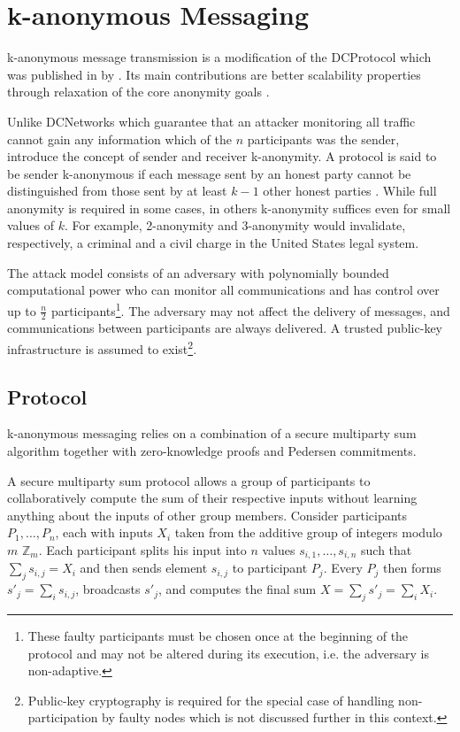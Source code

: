 \section{k-anonymous Messaging} \label{sec:k-anonymous_messaging}


k-anonymous message transmission is a modification of the \ac{DCProtocol} which was published in \citeyear{von2003k} by \citeauthor{von2003k}. Its main contributions are better scalability properties through relaxation
of the core anonymity goals \cite{von2003k}.

Unlike \acp{DCNetwork} which guarantee that an attacker monitoring all traffic cannot gain
any information which of the $n$ participants was the sender, \citeauthor{von2003k} introduce
the concept of sender and receiver k-anonymity. A protocol is said to be sender k-anonymous
if each message sent by an honest party cannot be distinguished from those sent by at least $k - 1$
other honest parties \cite{von2003k}. While full anonymity is required in some cases, in others
k-anonymity suffices even for small values of $k$. For example, 2-anonymity and 3-anonymity would invalidate, respectively, a criminal and a civil charge in the United States legal system.

The attack model consists of an adversary with polynomially bounded computational power
who can monitor all communications and
has control over up to $\frac{n}{2}$ participants\footnote{
These faulty participants must be chosen once at the beginning of the protocol and may not
be altered during its execution, i.e. the adversary is non-adaptive.}. The adversary may not affect
the delivery of messages, and communications between participants are always delivered.
A trusted public-key infrastructure is assumed to exist\footnote{Public-key cryptography is
required for the special case of handling non-participation by faulty nodes which is not discussed further
in this context.}.

\subsection{Protocol}

k-anonymous messaging relies on a combination of a secure multiparty sum algorithm
together with zero-knowledge proofs and Pedersen commitments.

A secure multiparty sum protocol allows a group of participants to collaboratively
compute the sum of their respective inputs without learning anything about the
inputs of other group members. Consider participants $P_1, \ldots, P_n$, each with
inputs $X_i$ taken from the additive group of integers modulo $m$ $\mathbb{Z}_m$.
Each participant splits his input into $n$ values $s_{i,1}, \ldots, s_{i,n}$ such that $\sum_j s_{i,j} = X_i$
and then sends element $s_{i,j}$ to participant $P_j$. Every $P_j$ then forms
$s'_j = \sum_i s_{i,j}$, broadcasts $s'_j$, and computes the final sum $X = \sum_j s'_j = \sum_i X_i$.

